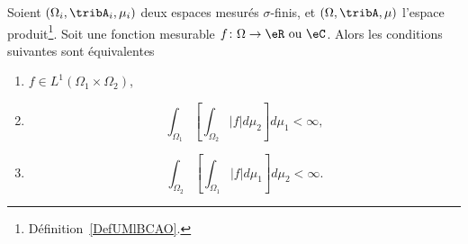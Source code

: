 \begin{corollary}           \label{CorTKZKwP}
	Soient \( (\Omega_i,\tribA_i,\mu_i)\) deux espaces mesurés \( \sigma\)-finis, et \( (\Omega,\tribA,\mu)\) l'espace produit\footnote{Définition~\ref{DefUMlBCAO}.}. Soit une fonction mesurable \( f\colon \Omega\to \eR\text{ ou }\eC\). Alors les conditions suivantes sont équivalentes
	\begin{enumerate}
		\item   \label{ITEMooZRAXooTRDIlZ}
		      \( f\in L^1(\Omega_1\times \Omega_2)\),
		\item       \label{ITEMooJMPLooZKwxQC}
		      \begin{equation}
			      \int_{\Omega_1}\left[ \int_{\Omega_2}| f |d\mu_2 \right]d\mu_1 <\infty,
		      \end{equation}
		\item   \label{ITEMooLLBCooTRycwG}
		      \begin{equation}
			      \int_{\Omega_2}\left[ \int_{\Omega_1}| f |d\mu_1 \right]d\mu_2 <\infty.
		      \end{equation}
	\end{enumerate}
\end{corollary}

